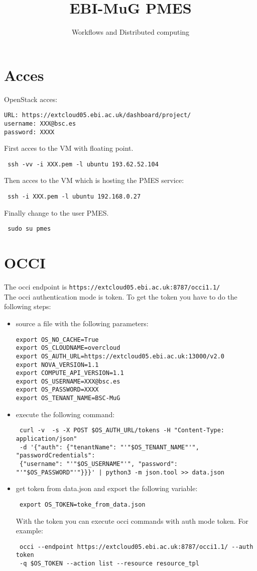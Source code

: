 \documentclass[a4paper,10pt]{article}
\title{EBI-MuG PMES}
\author{Workflows and Distributed computing}
\begin{document}
\maketitle

\section{Acces}
OpenStack acces:
\begin{verbatim}
URL: https://extcloud05.ebi.ac.uk/dashboard/project/
username: XXX@bsc.es
password: XXXX
\end{verbatim}

First acces to the VM with floating point.
\begin{verbatim}
 ssh -vv -i XXX.pem -l ubuntu 193.62.52.104
\end{verbatim}
Then acces to the VM which is hosting the PMES service:
\begin{verbatim}
 ssh -i XXX.pem -l ubuntu 192.168.0.27
\end{verbatim}
Finally change to the user PMES.
\begin{verbatim}
 sudo su pmes
\end{verbatim}

\section{OCCI}
The occi endpoint is \texttt{https://extcloud05.ebi.ac.uk:8787/occi1.1/} \\
The occi authentication mode is token. To get the token you have to do the following steps:
\begin{itemize}
 \item source a file with the following parameters:
\begin{verbatim}
export OS_NO_CACHE=True
export OS_CLOUDNAME=overcloud
export OS_AUTH_URL=https://extcloud05.ebi.ac.uk:13000/v2.0
export NOVA_VERSION=1.1
export COMPUTE_API_VERSION=1.1
export OS_USERNAME=XXX@bsc.es
export OS_PASSWORD=XXXX
export OS_TENANT_NAME=BSC-MuG
\end{verbatim}
\item execute the following command:
\begin{verbatim}
 curl -v  -s -X POST $OS_AUTH_URL/tokens -H "Content-Type: application/json" 
 -d '{"auth": {"tenantName": "'"$OS_TENANT_NAME"'", "passwordCredentials": 
 {"username": "'"$OS_USERNAME"'", "password": 
"'"$OS_PASSWORD"'"}}}' | python3 -m json.tool >> data.json
\end{verbatim}
\item get token from data.json and export the following variable:
\begin{verbatim}
 export OS_TOKEN=toke_from_data.json
\end{verbatim}

With the token you can execute occi commands with auth mode token. For example:
\begin{verbatim}
 occi --endpoint https://extcloud05.ebi.ac.uk:8787/occi1.1/ --auth token 
 -q $OS_TOKEN --action list --resource resource_tpl
\end{verbatim}

\end{itemize}
\end{document}

